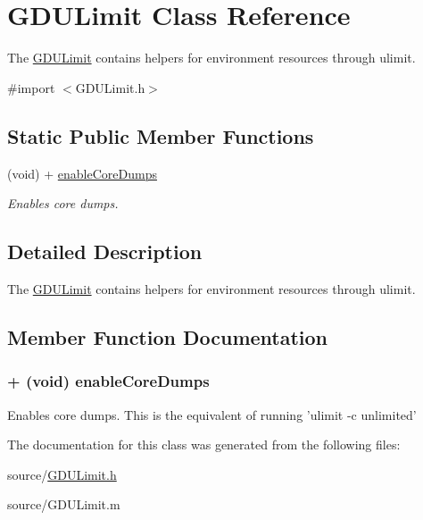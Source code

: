 \hypertarget{interface_g_d_u_limit}{
\section{GDULimit Class Reference}
\label{interface_g_d_u_limit}
}


The \hyperlink{interface_g_d_u_limit}{GDULimit} contains helpers for environment resources through ulimit.  


{\ttfamily \#import $<$GDULimit.h$>$}\subsection*{Static Public Member Functions}
\begin{DoxyCompactItemize}
\item 
(void) + \hyperlink{interface_g_d_u_limit_ab657cde9b16d4cb6f5b77fd96fe917e0}{enableCoreDumps}
\begin{DoxyCompactList}\small\item\em Enables core dumps. \item\end{DoxyCompactList}\end{DoxyCompactItemize}


\subsection{Detailed Description}
The \hyperlink{interface_g_d_u_limit}{GDULimit} contains helpers for environment resources through ulimit. 

\subsection{Member Function Documentation}
\hypertarget{interface_g_d_u_limit_ab657cde9b16d4cb6f5b77fd96fe917e0}{
\subsubsection[{enableCoreDumps}]{\setlength{\rightskip}{0pt plus 5cm}+ (void) enableCoreDumps }}
\label{interface_g_d_u_limit_ab657cde9b16d4cb6f5b77fd96fe917e0}


Enables core dumps. This is the equivalent of running 'ulimit -\/c unlimited' 

The documentation for this class was generated from the following files:\begin{DoxyCompactItemize}
\item 
source/\hyperlink{_g_d_u_limit_8h}{GDULimit.h}\item 
source/GDULimit.m\end{DoxyCompactItemize}
